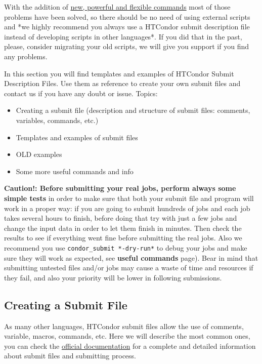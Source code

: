 \documentclass[a4paper,10pt]{article}
\begin{document}
With the addition of \href{http://research.cs.wisc.edu/htcondor/manual/v8.6/2\_5Submitting\_Job.html\#SECTION00352000000000000000}{new, powerful and flexible commands} most of those problems
have been solved, so there should be no need of using external scripts and *we
highly recommend you always use a HTCondor submit description file instead of
developing scripts in other languages*. If you did that in the past, please,
consider migrating your old scripts, we will give you support if you find any
problems.

In this section you will find templates and examples of HTCondor Submit
Description Files. Use them as reference to create your own submit files and
contact us if you have any doubt or issue. Topics:

\begin{itemize}
\item Creating a submit file (description and structure of
submit files: comments, variables, commands, etc.)
\item Templates and examples of submit files
\item OLD examples
\item Some more useful commands and info
\end{itemize}


\begin{mdframed}
\textbf{Caution!: Before submitting your real jobs, perform always some simple tests}
 in order to make sure that both your submit file and program will work in a
 proper way: if you are going to submit hundreds of jobs and each job takes
 several hours to finish, before doing that try with just a few jobs and change
 the input data in order to let them finish in minutes. Then check the results
 to see if everything went fine before submitting the real jobs. Also we
 recommend you use \texttt{condor\_submit *-dry-run*} to debug your jobs and make sure
 they will work as expected, see \textbf{useful commands} page). Bear in mind that
 submitting untested files and/or jobs may cause a waste of time and resources
 if they fail, and also your priority will be lower in following submissions.
\end{mdframed}


\subsection{Creating a Submit File}
\label{sec:orge1a0f30}

As many other languages, HTCondor submit files allow the use of comments,
variable, macros, commands, etc. Here we will describe the most common ones, you
can check the \href{https://research.cs.wisc.edu/htcondor/manual}{official documentation} for a complete and detailed
information about submit files and submitting process.
\end{document}
